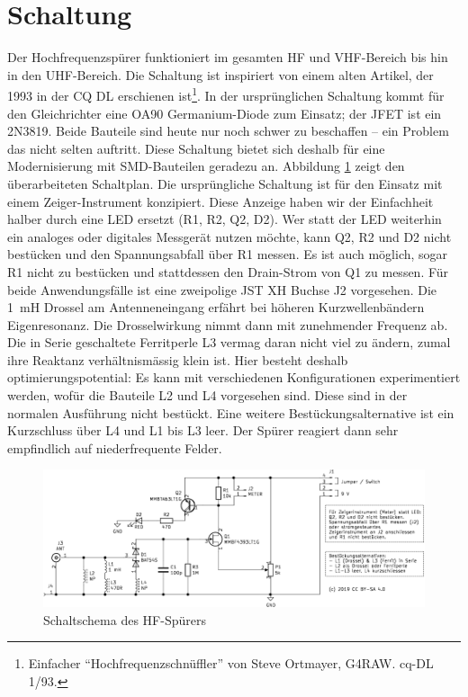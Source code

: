 \documentclass[a4paper,11pt,halfparskip,smallheadings,DIV=10]{scrartcl}
\begin{document}
\section{Schaltung}
Der Hochfrequenzspürer funktioniert im gesamten HF und VHF-Bereich bis
hin in den UHF-Bereich. Die Schaltung ist inspiriert von einem alten
Artikel, der 1993 in der CQ DL erschienen ist\footnote{Einfacher
``Hochfrequenzschnüffler'' von Steve Ortmayer, G4RAW. cq-DL 1/93.}. In der
ursprünglichen Schaltung kommt für den Gleichrichter eine OA90 Germanium-Diode
zum Einsatz; der JFET ist ein 2N3819. Beide Bauteile sind heute nur noch schwer
zu beschaffen -- ein Problem das nicht selten auftritt. Diese Schaltung bietet
sich deshalb für eine Modernisierung mit SMD-Bauteilen geradezu an. Abbildung
\ref{fig:schematic} zeigt den überarbeiteten Schaltplan. Die ursprüngliche
Schaltung ist für den Einsatz mit einem Zeiger-Instrument konzipiert. Diese
Anzeige haben wir der Einfachheit halber durch eine LED ersetzt (R1, R2, Q2, D2).
Wer statt der LED weiterhin ein analoges oder digitales Messgerät nutzen
möchte, kann Q2, R2 und D2 nicht bestücken und den Spannungsabfall über
R1 messen. Es ist auch möglich, sogar R1 nicht zu bestücken und stattdessen
den Drain-Strom von Q1 zu messen. Für beide Anwendungsfälle ist eine zweipolige JST XH
Buchse J2 vorgesehen. Die 1~mH Drossel am Antenneneingang erfährt bei höheren
Kurzwellenbändern Eigenresonanz. Die Drosselwirkung nimmt dann mit zunehmender
Frequenz ab. Die in Serie geschaltete Ferritperle L3 vermag daran nicht viel
zu ändern, zumal ihre Reaktanz verhältnismässig klein ist. Hier besteht deshalb
optimierungspotential: Es kann mit verschiedenen Konfigurationen experimentiert
werden, wofür die Bauteile L2 und L4 vorgesehen sind. Diese sind in der
normalen Ausführung nicht bestückt. Eine weitere Bestückungsalternative ist
ein Kurzschluss über L4 und L1 bis L3 leer. Der Spürer reagiert dann sehr
empfindlich auf niederfrequente Felder.

\begin{figure}
\includegraphics[width=\textwidth]{schaltung.pdf}
\caption{Schaltschema des HF-Spürers}
\label{fig:schematic}
\end{figure}
\end{document}
